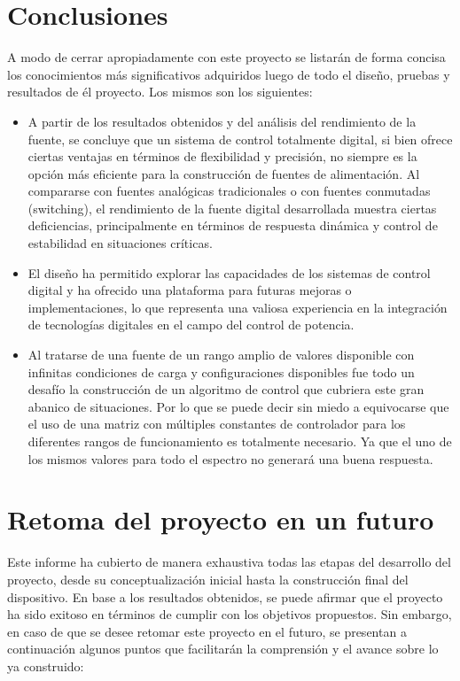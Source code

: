 \section{Conclusiones} 
A modo de cerrar apropiadamente con este proyecto se listarán de forma concisa los conocimientos más significativos adquiridos luego de todo el diseño, pruebas y resultados de él proyecto. Los mismos son los siguientes:\par 
\begin{itemize}
    \item A partir de los resultados obtenidos y del análisis del rendimiento de la fuente, se concluye que un sistema de control totalmente digital, si bien ofrece ciertas ventajas en términos de flexibilidad y precisión, no siempre es la opción más eficiente para la construcción de fuentes de alimentación. Al compararse con fuentes analógicas tradicionales o con fuentes conmutadas (switching), el rendimiento de la fuente digital desarrollada muestra ciertas deficiencias, principalmente en términos de respuesta dinámica y control de estabilidad en situaciones críticas.\par
    \item El diseño ha permitido explorar las capacidades de los sistemas de control digital y ha ofrecido una plataforma para futuras mejoras o implementaciones, lo que representa una valiosa experiencia en la integración de tecnologías digitales en el campo del control de potencia.
    \item Al tratarse de una fuente de un rango amplio de valores disponible con infinitas condiciones de carga y configuraciones disponibles fue todo un desafío la construcción de un algoritmo de control que cubriera este gran abanico de situaciones. Por lo que se puede decir sin miedo a equivocarse que el uso de una matriz con múltiples constantes de controlador para los diferentes rangos de funcionamiento es totalmente necesario. Ya que el uno de los mismos valores para todo el espectro no generará una buena respuesta.
\end{itemize}

\section{Retoma del proyecto en un futuro} 
Este informe ha cubierto de manera exhaustiva todas las etapas del desarrollo del proyecto, desde su conceptualización inicial hasta la construcción final del dispositivo. En base a los resultados obtenidos, se puede afirmar que el proyecto ha sido exitoso en términos de cumplir con los objetivos propuestos. Sin embargo, en caso de que se desee retomar este proyecto en el futuro, se presentan a continuación algunos puntos que facilitarán la comprensión y el avance sobre lo ya construido:

